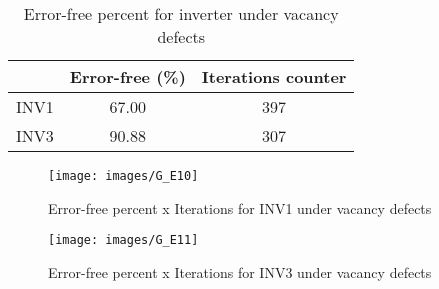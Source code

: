 \begin{table}[h]
\begin{center}
\caption{Error-free percent for inverter under vacancy defects}
\begin{tabular}{|c|c|c|}
\hline
 & Error-free (\%) & Iterations counter \\
\hline
 INV1 & 67.00 & 397 \\
\hline
 INV3 & 90.88 & 307 \\
\hline

\end{tabular}
\end{center}
\end{table}

\begin{figure}[h!]
\center
\texttt{[image: images/G\_E10]}
\caption{Error-free percent x Iterations for INV1 under vacancy defects}
\label{figure:inverter_reg_gt5}
\end{figure}

\begin{figure}[h!]
\center
\texttt{[image: images/G\_E11]}
\caption{Error-free percent x Iterations for INV3 under vacancy defects}
\label{figure:inverter_mod_gt5}
\end{figure}
\pagebreak